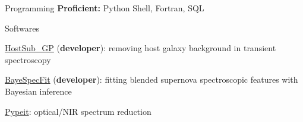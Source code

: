 


\begin{cvskills}




\cvskill
{Programming} %
{{\bf\color{darktext}Proficient:} Python Shell, Fortran, SQL} %



\cvskill
{Softwares} %
{\begin{cvitems}
    \item {\href{https://github.com/slowdivePTG/HostSub_GP}{HostSub\_GP} ({\bf\color{darktext}developer}): removing host galaxy background in transient spectroscopy}
    \item {\href{https://github.com/slowdivePTG/BayeSpecFit}{BayeSpecFit} ({\bf\color{darktext}developer}): fitting blended supernova spectroscopic features with Bayesian inference}
    \item \href{https://pypeit.readthedocs.io/en/release/}{Pypeit}: optical/NIR spectrum reduction
\end{cvitems}}%

\end{cvskills}